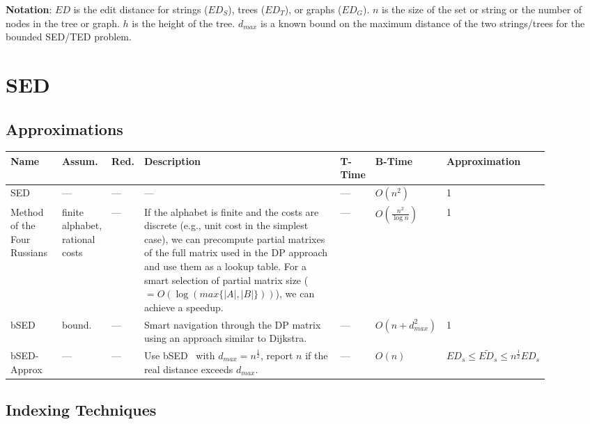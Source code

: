 \documentclass{article}
\author{Daniel Schmitt}
\title{}
\date{}
\begin{document}
\textbf{Notation}: $ED$ is the edit distance for strings ($ED_S$), trees ($ED_T$), or graphs ($ED_G$). $n$ is the size of the set or string or the number of nodes in the tree or graph. $h$ is the height of the tree. $d_{max}$ is a known bound on the maximum distance of the two strings/trees for the bounded SED/TED problem.

\section{SED}

\subsection{Approximations}

\begin{small}
    \begin{longtable}[c]{p{0.085\linewidth}p{0.05\linewidth}p{0.035\linewidth}p{0.43\linewidth}p{0.05\linewidth}p{0.1\linewidth}p{0.15\linewidth}}
        \toprule
        Name    &   Assum.  & Red.  &   Description  &   T-Time   &   B-Time    &   Approximation   \tabularnewline
        \midrule\endhead
        SED &   ---     &   --- & --- &   ---  &   $O(n^2)$    &   1   \tabularnewline
        Method of the Four Russians~\cite{DBLP:journals/jcss/MasekP80}&
        finite alphabet, rational costs&
        ---&
        If the alphabet is finite and the costs are discrete (e.g., unit cost in the simplest case), we can precompute partial matrixes of the full matrix used in the DP approach and use them as a lookup table. For a smart selection of partial matrix size ($=O(\log (max\{|A|, |B|\}))$), we can achieve a speedup.&
        ---&
        $O(\frac{n^2}{\log n})$&
        1
        \tabularnewline
        bSED~\cite{DBLP:journals/siamcomp/LandauMS98} &   bound.  &   --- & Smart navigation through the DP matrix using an approach similar to Dijkstra. &   --- &   $O(n + d_{max}^2)$    &   1   \tabularnewline
        bSED-Approx&
        ---&
        ---&
        Use bSED~\cite{DBLP:journals/siamcomp/LandauMS98} with $d_{max}=n^\frac{1}{2}$, report $n$ if the real distance exceeds $d_{max}$.&
        ---&
        $O(n)$&
        $ED_s\leq \widetilde{ED_s}\leq n^\frac{1}{2}ED_s$
        \tabularnewline
        \bottomrule
    \end{longtable}
\end{small}

\subsection{Indexing Techniques}
\end{document}
